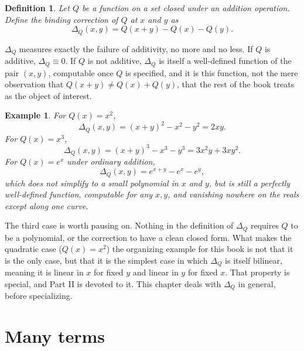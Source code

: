 \documentclass[11pt]{book}
\newtheorem{definition}[theorem]{Definition}
\newtheorem{example}[theorem]{Example}
\begin{document}
\begin{definition}
Let $Q$ be a function on a set closed under an addition operation. Define the \emph{binding correction} of $Q$ at $x$ and $y$ as
\[
\Delta_Q(x,y) = Q(x+y) - Q(x) - Q(y).
\]
\end{definition}

$\Delta_Q$ measures exactly the failure of additivity, no more and no less. If $Q$ is additive, $\Delta_Q \equiv 0$. If $Q$ is not additive, $\Delta_Q$ is itself a well-defined function of the pair $(x,y)$, computable once $Q$ is specified, and it is this function, not the mere observation that $Q(x+y) \ne Q(x)+Q(y)$, that the rest of the book treats as the object of interest.

\begin{example}
For $Q(x) = x^2$,
\[
\Delta_Q(x,y) = (x+y)^2 - x^2 - y^2 = 2xy.
\]
For $Q(x) = x^3$,
\[
\Delta_Q(x,y) = (x+y)^3 - x^3 - y^3 = 3x^2y + 3xy^2.
\]
For $Q(x) = e^x$ under ordinary addition,
\[
\Delta_Q(x,y) = e^{x+y} - e^x - e^y,
\]
which does not simplify to a small polynomial in $x$ and $y$, but is still a perfectly well-defined function, computable for any $x,y$, and vanishing nowhere on the reals except along one curve.
\end{example}

The third case is worth pausing on. Nothing in the definition of $\Delta_Q$ requires $Q$ to be a polynomial, or the correction to have a clean closed form. What makes the quadratic case ($Q(x)=x^2$) the organizing example for this book is not that it is the only case, but that it is the simplest case in which $\Delta_Q$ is itself bilinear, meaning it is linear in $x$ for fixed $y$ and linear in $y$ for fixed $x$. That property is special, and Part II is devoted to it. This chapter deals with $\Delta_Q$ in general, before specializing.

\section{Many terms}
\end{document}

